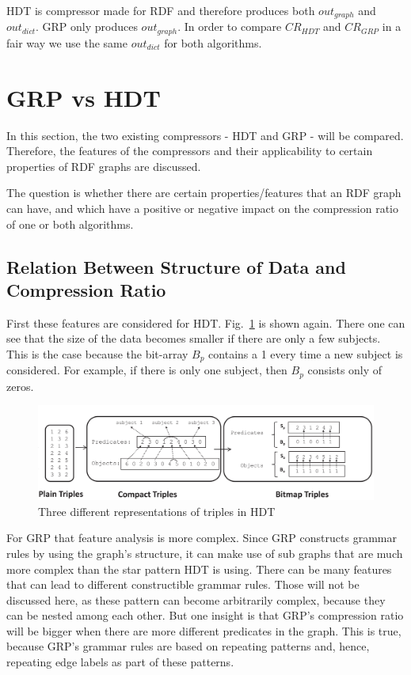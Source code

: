 HDT is compressor made for RDF and therefore produces both  $out_{graph}$ and $out_{dict}$. GRP only produces  $out_{graph}$. In order to compare $CR_{HDT}$ and $CR_{GRP}$ in a fair way we use the same $out_{dict}$ for both algorithms.

\section{GRP vs HDT}\label{sec:approachGRPvsHDT}

In this section, the two existing compressors - HDT and GRP - will be compared. Therefore, the features of the compressors and their applicability to certain properties of RDF graphs are discussed.

The question is whether there are certain properties/features that an RDF graph can have, and which have a positive or negative impact on the compression ratio of one or both algorithms. 

\subsection{Relation Between Structure of Data and Compression Ratio}\label{sec:relationDataStructureComprRatio}

First these features are considered for HDT. Fig.~\ref{fig:hdt_overview_1} is shown again. There one can see that the size of the data becomes smaller if there are only a few subjects. This is the case because the bit-array $B_p$ contains a 1 every time a new subject is considered. For example, if there is only one subject, then $B_p$ consists only of zeros.

\begin{figure}[h]
	\centering
	\includegraphics[width=1\textwidth]{figures/relatedwork/hdt1}
	\caption{Three different representations of triples in HDT}
	\label{fig:hdt_overview_1}
\end{figure}

For GRP that feature analysis is more complex. Since GRP constructs grammar rules by using the graph's structure, it can make use of sub graphs that are much more complex than the star pattern HDT is using. There can be many features that can lead to different constructible grammar rules. Those will not be discussed here, as these pattern can become arbitrarily complex, because they can be nested among each other. But one insight is that GRP's compression ratio will be bigger when there are more different predicates in the graph. This is true, because GRP's grammar rules are based on repeating patterns and, hence, repeating edge labels as part of these patterns.

